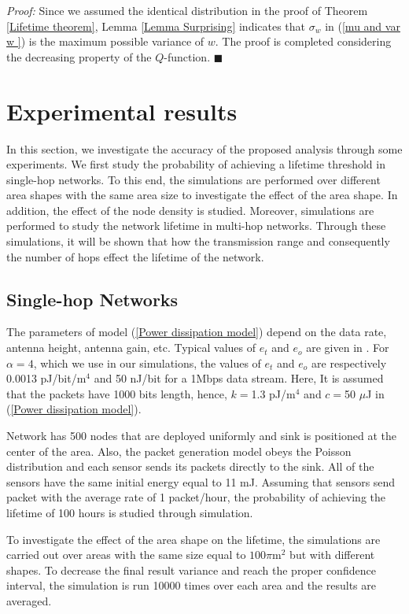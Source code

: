 \documentclass[conference]{IEEEtran}
\begin{document}
\textit{Proof:} Since we assumed the identical distribution in the
proof of Theorem \ref{Lifetime theorem}, Lemma \ref{Lemma
Surprising} indicates that $\sigma_w$ in (\ref{mu and var w }) is
the maximum possible variance of $w$. The proof is completed
considering the decreasing property of the $Q$-function. \hfill
$\blacksquare$

\section{Experimental results}\label{Section Simulations}
In this section, we investigate the accuracy of the proposed
analysis through some experiments. We first study the probability of
achieving a lifetime threshold in single-hop networks. To this end,
the simulations are performed over different area shapes with the
same area size to investigate the effect of the area shape. In
addition, the effect of the node density is studied. Moreover,
simulations are performed to study the network lifetime in multi-hop
networks. Through these simulations, it will be shown that how the
transmission range and consequently the number of hops effect the
lifetime of the network.

\subsection{Single-hop Networks}
The parameters of model (\ref{Power dissipation model}) depend on
the data rate, antenna height, antenna gain, etc. Typical values of
$e_t$ and $e_o$ are given in \cite{Heinzelman_Phd_Thes}. For $\alpha
= 4$, which we use in our simulations, the values of $e_t$ and $e_o$
are respectively 0.0013 pJ/bit/$\text{m}^4$ and 50 nJ/bit for a
1Mbps data stream. Here, It is assumed that the packets have 1000
bits length, hence, $k =$1.3 pJ/$\text{m}^4$ and $c =$50 $\mu$J in
(\ref{Power dissipation model}).

Network has 500 nodes that are deployed uniformly and sink is
positioned at the center of the area. Also, the packet generation
model obeys the Poisson distribution and each sensor sends its
packets directly to the sink. All of the sensors have the same
initial energy equal to 11 mJ. Assuming that sensors send packet
with the average rate of 1 packet/hour, the probability of achieving
the lifetime of 100 hours is studied through simulation.

To investigate the effect of the area shape on the lifetime, the
simulations are carried out over areas with the same size equal to
$100 \pi \text{m}^2$ but with different shapes. To decrease the
final result variance and reach the proper confidence interval, the
simulation is run 10000 times over each area and the results are
averaged.
\end{document}
